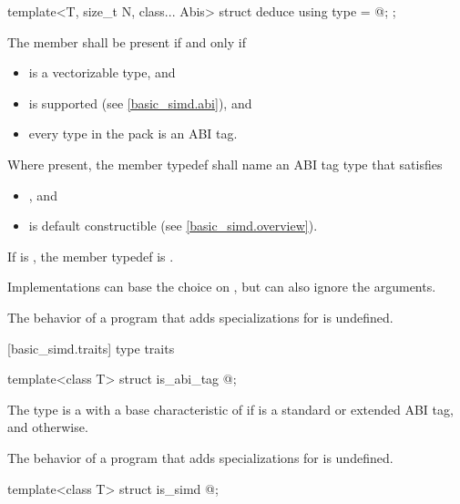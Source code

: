 \begin{itemdecl}
template<T, size_t N, class... Abis> struct deduce { using type = @\seebelow@; };
\end{itemdecl}

\begin{itemdescr}
\pnum
The member  shall be present if and only if
\begin{itemize}
  \item {} is a vectorizable type, and
  \item {} is supported (see \ref{basic_simd.abi}), and
  \item every type in the  pack is an ABI tag.
\end{itemize}

\pnum
Where present, the member typedef  shall name an ABI tag type that satisfies
\begin{itemize}
  \item {}, and
  \item {} is default constructible (see \ref{basic_simd.overview}).
\end{itemize}
If  is , the member typedef  is .
\begin{note}
  Implementations can base the choice on , but can also ignore the  arguments.
\end{note}

\pnum
The behavior of a program that adds specializations for  is undefined.
\end{itemdescr}

[basic_simd.traits]{ type traits}

\begin{itemdecl}
template<class T> struct is_abi_tag { @\seebelow@ };
\end{itemdecl}

\begin{itemdescr}
\pnum
The type  is a  with a base characteristic of  if  is a standard or extended ABI tag, and  otherwise.

\pnum
The behavior of a program that adds specializations for  is undefined.
\end{itemdescr}

\begin{itemdecl}
template<class T> struct is_simd { @\seebelow@ };
\end{itemdecl}

